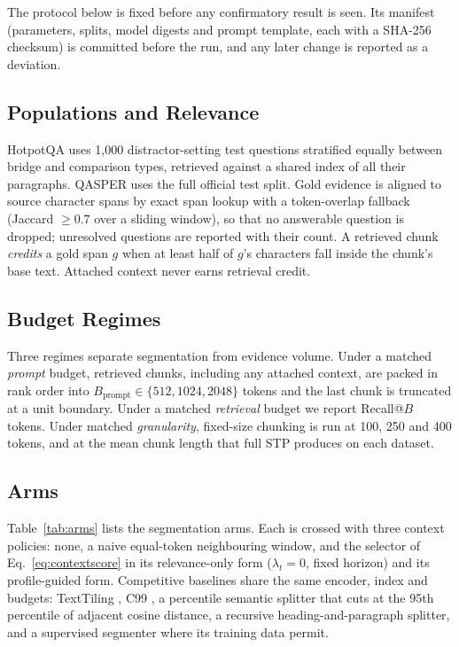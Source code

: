 \documentclass[10pt,a4paper]{article}
\begin{document}
The protocol below is fixed before any confirmatory result is seen. Its manifest (parameters, splits, model digests and prompt template, each with a SHA-256 checksum) is committed before the run, and any later change is reported as a deviation.

\subsection{Populations and Relevance}
HotpotQA uses 1,000 distractor-setting test questions stratified equally between bridge and comparison types, retrieved against a shared index of all their paragraphs. QASPER uses the full official test split. Gold evidence is aligned to source character spans by exact span lookup with a token-overlap fallback (Jaccard $\ge0.7$ over a sliding window), so that no answerable question is dropped; unresolved questions are reported with their count. A retrieved chunk \emph{credits} a gold span $g$ when at least half of $g$'s characters fall inside the chunk's base text. Attached context never earns retrieval credit.

\subsection{Budget Regimes}
Three regimes separate segmentation from evidence volume. Under a matched \emph{prompt} budget, retrieved chunks, including any attached context, are packed in rank order into $B_{\mathrm{prompt}}\in\{512,1024,2048\}$ tokens and the last chunk is truncated at a unit boundary. Under a matched \emph{retrieval} budget we report Recall@$B$ tokens. Under matched \emph{granularity}, fixed-size chunking is run at 100, 250 and 400 tokens, and at the mean chunk length that full STP produces on each dataset.

\subsection{Arms}
Table~\ref{tab:arms} lists the segmentation arms. Each is crossed with three context policies: none, a naive equal-token neighbouring window, and the selector of Eq.~\eqref{eq:contextscore} in its relevance-only form ($\lambda_t=0$, fixed horizon) and its profile-guided form. Competitive baselines share the same encoder, index and budgets: TextTiling \cite{hearst1997texttiling}, C99 \cite{choi2000c99}, a percentile semantic splitter that cuts at the 95th percentile of adjacent cosine distance, a recursive heading-and-paragraph splitter, and a supervised segmenter \cite{koshorek2018textseg} where its training data permit.
\end{document}
